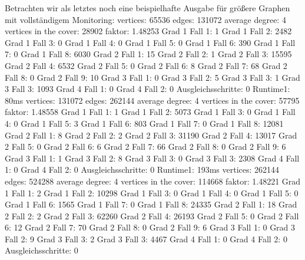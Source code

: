 \documentclass[12pt,onecolumn, notitlepage]{scrartcl}
\begin{document}
Betrachten wir als letztes noch eine beispielhafte Ausgabe für größere Graphen mit vollständigem Monitoring: \newline \newline 
vertices: 65536 edges: 131072 average degree: 4 \newline 
vertices in the cover: 28902 faktor: 1.48253\newline 
Grad 1 Fall 1: 1 Grad 1 Fall 2: 2482 Grad 1 Fall 3: 0 Grad 1 Fall 4: 0 Grad 1 Fall 5: 0 Grad 1 Fall 6: 390 Grad 1 Fall 7: 0 Grad 1 Fall 8: 6030\newline 
Grad 2 Fall 1: 15 Grad 2 Fall 2: 1 Grad 2 Fall 3: 15595 Grad 2 Fall 4: 6532 Grad 2 Fall 5: 0 Grad 2 Fall 6: 8 Grad 2 Fall 7: 68 Grad 2 Fall 8: 0 Grad 2 Fall 9: 10\newline 
Grad 3 Fall 1: 0 Grad 3 Fall 2: 5 Grad 3 Fall 3: 1 Grad 3 Fall 3: 1093 Grad 4 Fall 1: 0 Grad 4 Fall 2: 0 Ausgleichsschritte: 0\newline 
 Runtime1: 80ms\newline \newline 
vertices: 131072 edges: 262144 average degree: 4 \newline 
vertices in the cover: 57795 faktor: 1.48558\newline 
Grad 1 Fall 1: 1 Grad 1 Fall 2: 5073 Grad 1 Fall 3: 0 Grad 1 Fall 4: 0 Grad 1 Fall 5: 3 Grad 1 Fall 6: 803 Grad 1 Fall 7: 0 Grad 1 Fall 8: 12081\newline 
Grad 2 Fall 1: 8 Grad 2 Fall 2: 2 Grad 2 Fall 3: 31190 Grad 2 Fall 4: 13017 Grad 2 Fall 5: 0 Grad 2 Fall 6: 6 Grad 2 Fall 7: 66 Grad 2 Fall 8: 0 Grad 2 Fall 9: 6\newline 
Grad 3 Fall 1: 1 Grad 3 Fall 2: 8 Grad 3 Fall 3: 0 Grad 3 Fall 3: 2308 Grad 4 Fall 1: 0 Grad 4 Fall 2: 0 Ausgleichsschritte: 0\newline 
 Runtime1: 193ms\newline \newline 
vertices: 262144 edges: 524288 average degree: 4 \newline 
vertices in the cover: 114668 faktor: 1.48221\newline 
Grad 1 Fall 1: 2 Grad 1 Fall 2: 10298 Grad 1 Fall 3: 0 Grad 1 Fall 4: 0 Grad 1 Fall 5: 0 Grad 1 Fall 6: 1565 Grad 1 Fall 7: 0 Grad 1 Fall 8: 24335\newline 
Grad 2 Fall 1: 18 Grad 2 Fall 2: 2 Grad 2 Fall 3: 62260 Grad 2 Fall 4: 26193 Grad 2 Fall 5: 0 Grad 2 Fall 6: 12 Grad 2 Fall 7: 70 Grad 2 Fall 8: 0 Grad 2 Fall 9: 6\newline 
Grad 3 Fall 1: 0 Grad 3 Fall 2: 9 Grad 3 Fall 3: 2 Grad 3 Fall 3: 4467 Grad 4 Fall 1: 0 Grad 4 Fall 2: 0 Ausgleichsschritte: 0\newline 
\end{document}
